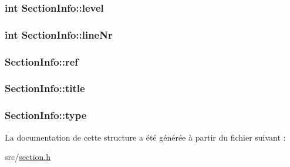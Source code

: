 \subsubsection[{level}]{\setlength{\rightskip}{0pt plus 5cm}int Section\+Info\+::level}\label{struct_section_info_ac215add41d774d87dfd6a56acb4570c5}
\hypertarget{struct_section_info_ae57cb5b4a832c3768cf3f59fc1469846}{}
\subsubsection[{line\+Nr}]{\setlength{\rightskip}{0pt plus 5cm}int Section\+Info\+::line\+Nr}\label{struct_section_info_ae57cb5b4a832c3768cf3f59fc1469846}
\hypertarget{struct_section_info_ad0f4c1f86263d2a044d2b5a183bb3387}{}
\subsubsection[{ref}]{ Section\+Info\+::ref}\label{struct_section_info_ad0f4c1f86263d2a044d2b5a183bb3387}
\hypertarget{struct_section_info_a6351881d52095f7bbe11e96a7102f9a6}{}
\subsubsection[{title}]{ Section\+Info\+::title}\label{struct_section_info_a6351881d52095f7bbe11e96a7102f9a6}
\hypertarget{struct_section_info_a028667b2061a4cfa8a5ed9765e0583d2}{}
\subsubsection[{type}]{ Section\+Info\+::type}\label{struct_section_info_a028667b2061a4cfa8a5ed9765e0583d2}


La documentation de cette structure a été générée à partir du fichier suivant \+:\begin{DoxyCompactItemize}
\item 
src/\hyperlink{section_8h}{section.\+h}\end{DoxyCompactItemize}
